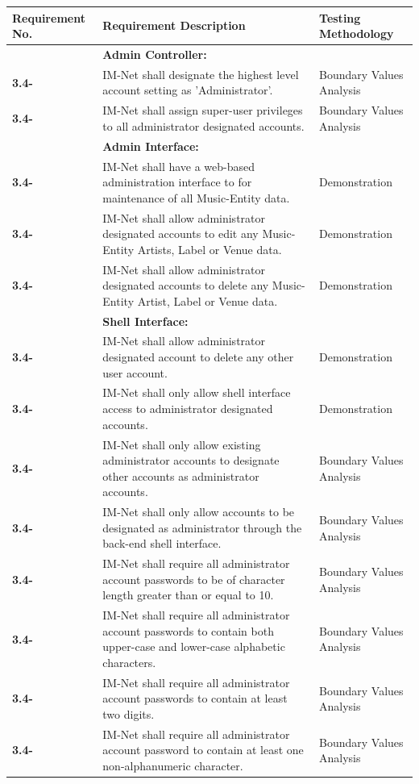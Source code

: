 \documentclass[letterpaper,12pt]{article}
\newcounter{rcounter}							%
\newcommand\rnumber{\stepcounter{rcounter}\arabic{rcounter}}
\begin{document}
{\begin{center}
\begin{tabular}{|l|p{4in}|p{2in}|}
\end{tabular} 
\end{center}

\setcounter{rcounter}{0}
\begin{center}
\begin{tabular}{|l|p{4in}|p{2in}|}
\hline 
Requirement No. & Requirement Description & Testing Methodology \\ 
\hline
& \textbf{Admin Controller:} & \\
\hline
\textbf{3.4-\rnumber} & IM-Net shall designate the highest level account setting as 'Administrator'. & Boundary Values Analysis \\ 
\hline
\textbf{3.4-\rnumber} & IM-Net shall assign super-user privileges to all administrator designated accounts. & Boundary Values Analysis \\ 
\hline 
& \textbf{Admin Interface:} & \\
\hline
\textbf{3.4-\rnumber} & IM-Net shall have a web-based administration interface to for maintenance of all Music-Entity data. & Demonstration \\ 
\hline 
\textbf{3.4-\rnumber} & IM-Net shall allow administrator designated accounts to edit any Music-Entity Artists, Label or Venue data. & Demonstration \\ 
\hline 
\textbf{3.4-\rnumber} & IM-Net shall allow administrator designated accounts to delete any Music-Entity Artist, Label or Venue data. & Demonstration \\ 
\hline 
& \textbf{Shell Interface:} & \\
\hline
\textbf{3.4-\rnumber} & IM-Net shall allow administrator designated account to delete any other user account. & Demonstration \\ 
\hline
\textbf{3.4-\rnumber} & IM-Net shall only allow shell interface access to administrator designated accounts. & Demonstration \\ 
\hline 
\textbf{3.4-\rnumber} & IM-Net shall only allow existing administrator accounts to designate other accounts as administrator accounts. & Boundary Values Analysis \\
\hline 
\textbf{3.4-\rnumber} & IM-Net shall only allow accounts to be designated as administrator through the back-end shell interface. & Boundary Values Analysis \\ 
\hline 
\textbf{3.4-\rnumber} & IM-Net shall require all administrator account passwords to be of character length greater than or equal to 10. & Boundary Values Analysis \\ 
\hline 
\textbf{3.4-\rnumber} & IM-Net shall require all administrator account passwords to contain both upper-case and lower-case alphabetic characters. & Boundary Values Analysis \\
\hline 
\textbf{3.4-\rnumber} & IM-Net shall require all administrator account passwords to contain at least two digits. & Boundary Values Analysis \\ 
\hline 
\textbf{3.4-\rnumber} & IM-Net shall require all administrator account password to contain at least one non-alphanumeric character. & Boundary Values Analysis \\ 
\hline 



\end{tabular}
\end{center}}
\end{document}
